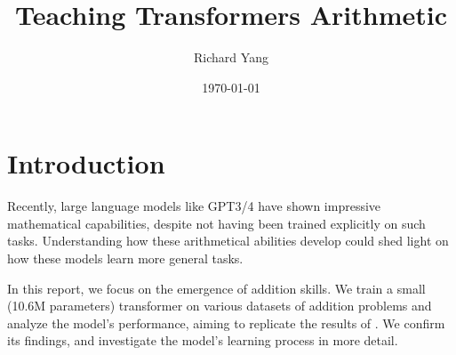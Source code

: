 \documentclass[12pt]{article}
\title{Teaching Transformers Arithmetic}
\author{Richard Yang}
\date{\today}
\begin{document}
\maketitle

\section{Introduction}
Recently, large language models like GPT3/4 have shown impressive mathematical capabilities,
despite not having been trained explicitly on such tasks.
Understanding how these arithmetical abilities develop could shed light on how these models learn more general tasks.

In this report, we focus on the emergence of addition skills.
We train a small (10.6M parameters) transformer on various datasets of addition problems and analyze the model's performance,
aiming to replicate the results of \cite{lee2023teaching}.
We confirm its findings, and investigate the model's learning process in more detail.
\end{document}
